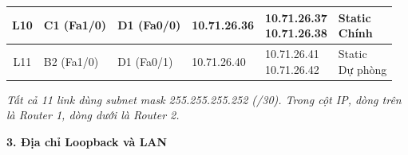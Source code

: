 \begin{table}[H]
\begin{tabularx}{\textwidth}{
|c|l|l|l|>{\raggedright\arraybackslash}X|l|
}
L10 &
C1 (Fa1/0) &
D1 (Fa0/0) &
10.71.26.36 &
\makecell[l]{10.71.26.37\\10.71.26.38} &
\makecell[l]{Static\\Chính} \\
\hline

L11 &
B2 (Fa1/0) &
D1 (Fa0/1) &
10.71.26.40 &
\makecell[l]{10.71.26.41\\10.71.26.42} &
\makecell[l]{Static\\Dự phòng} \\
\hline

\end{tabularx}
\end{table}

{\footnotesize
\textit{
Tất cả 11 link dùng subnet mask
255.255.255.252 (/30).
Trong cột IP, dòng trên là Router 1,
dòng dưới là Router 2.
}
}


\clearpage

{\bfseries\large
3. Địa chỉ Loopback và LAN
}

\vspace{0.2cm}

